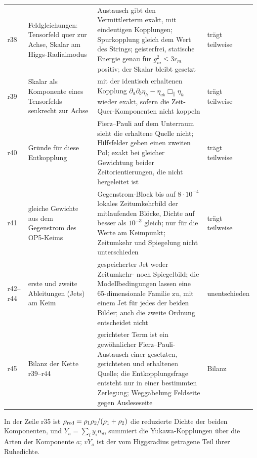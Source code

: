 \begin{center}
\begin{tabular}{@{}p{.07\linewidth}p{.25\linewidth}p{.43\linewidth}p{.15\linewidth}@{}}
r38 & Feldgleichungen: Tensorfeld quer zur Achse, Skalar am Higgs-Radialmodus & Austausch gibt den Vermittlerterm exakt, mit eindeutigen Kopplungen; Spurkopplung gleich dem Wert des Strings; geisterfrei, statische Energie genau für \(g_m^2\le3r_m\) positiv; der Skalar bleibt gesetzt & trägt teilweise \\
r39 & Skalar als Komponente eines Tensorfelds senkrecht zur Achse & mit der identisch erhaltenen Kopplung \(\partial_a\partial_b\eta_h-\eta_{ab}\Box_\parallel\eta_h\) wieder exakt, sofern die Zeit-Quer-Komponenten nicht koppeln & trägt teilweise \\
r40 & Gründe für diese Entkopplung & Fierz--Pauli auf dem Unterraum sieht die erhaltene Quelle nicht; Hilfsfelder geben einen zweiten Pol; exakt bei gleicher Gewichtung beider Zeitorientierungen, die nicht hergeleitet ist & trägt teilweise \\
r41 & gleiche Gewichte aus dem Gegenstrom des OP5-Keims & Gegenstrom-Block bis auf \(8\cdot10^{-4}\) lokales Zeitumkehrbild der mitlaufenden Blöcke, Dichte auf besser als \(10^{-3}\) gleich; nur für die Werte am Keimpunkt; Zeitumkehr und Spiegelung nicht unterschieden & trägt teilweise \\
r42--r44 & erste und zweite Ableitungen (Jets) am Keim & gespeicherter Jet weder Zeitumkehr- noch Spiegelbild; die Modellbedingungen lassen eine 65-dimensionale Familie zu, mit einem Jet für jedes der beiden Bilder; auch die zweite Ordnung entscheidet nicht & unentschieden \\
r45 & Bilanz der Kette r39--r44 & gerichteter Term ist ein gewöhnlicher Fierz--Pauli-Austausch einer gesetzten, gerichteten und erhaltenen Quelle; die Entkopplungsfrage entsteht nur in einer bestimmten Zerlegung; Weggabelung Feldseite gegen Ausleseseite & Bilanz \\
\hline
\end{tabular}
\end{center}
In der Zeile r35 ist \(\rho_{\rm red}=\rho_1\rho_2/(\rho_1+\rho_2)\) die reduzierte Dichte der beiden Komponenten, und
\(Y_a=\sum_i y_i n_{i0}\) summiert die Yukawa-Kopplungen über die Arten der Komponente \(a\); \(vY_a\) ist der vom Higgsradius getragene
Teil ihrer Ruhedichte.


